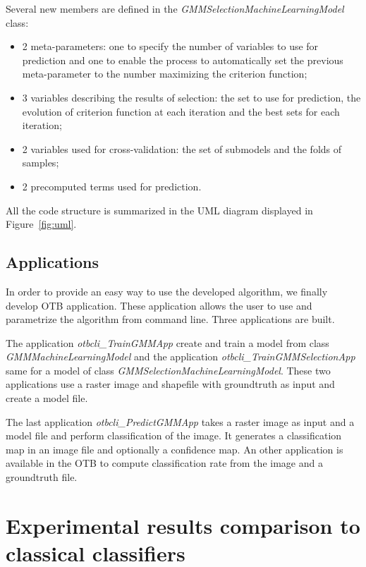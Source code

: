 \documentclass[a4paper,11pt,DIV=16,abstracton]{scrartcl}
\begin{document}
    Several new members are defined in the \emph{GMMSelectionMachineLearningModel} class:
    \begin{itemize}
        \item 2 meta-parameters: one to specify the number of variables to use for prediction and one to enable the process to automatically set the previous meta-parameter to the number maximizing the criterion function;
        \item 3 variables describing the results of selection: the set to use for prediction, the evolution of criterion function at each iteration and the best sets for each iteration;
        \item 2 variables used for cross-validation: the set of submodels and the folds of samples;
        \item 2 precomputed terms used for prediction.
    \end{itemize}

    All the code structure is summarized in the UML diagram displayed in Figure~\ref{fig:uml}.

    \subsection{Applications}

    In order to provide an easy way to use the developed algorithm, we finally develop OTB application. These application allows the user to use and parametrize the algorithm from command line. Three applications are built.

    The application \emph{otbcli\_TrainGMMApp} create and train a model from class \emph{GMMMachineLearningModel} and the application \emph{otbcli\_TrainGMMSelectionApp} same for a model of class \emph{GMMSelectionMachineLearningModel}. These two applications use a raster image and shapefile with groundtruth as input and create a model file.

    The last application \emph{otbcli\_PredictGMMApp} takes a raster image as input and a model file and perform classification of the image. It generates a classification map in an image file and optionally a confidence map. An other application is available in the OTB to compute classification rate from the image and a groundtruth file.

\section{Experimental results comparison to classical classifiers}
\label{sec:exp-otb}
\end{document}
